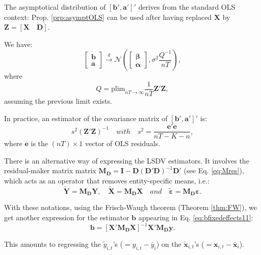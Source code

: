 \documentclass[
  12pt,
]{book}
\theoremstyle{definition}
\theoremstyle{definition}
\theoremstyle{definition}
\theoremstyle{definition}
\theoremstyle{remark}
\begin{document}
The asymptotical distribution of \([\mathbf{b}',\mathbf{a}']'\) derives from the standard OLS context: Prop. \ref{prp:asymptOLS} can be used after having replaced \(\mathbf{X}\) by \(\mathbf{Z}=[\mathbf{X} \quad \mathbf{D}]\).

We have:
\begin{equation}
\boxed{\left[
\begin{array}{c}
\mathbf{b}\\
\mathbf{a}
\end{array}
\right] \overset{d}{\rightarrow}
\mathcal{N}\left(
\left[
\begin{array}{c}
\boldsymbol\beta\\
\boldsymbol\alpha
\end{array}
\right],
\sigma^2 \frac{Q^{-1}}{nT}
\right),}
\end{equation}
where
\[
Q = \mbox{plim}_{nT \rightarrow \infty} \frac{1}{nT} \mathbf{Z}'\mathbf{Z},
\]
assuming the previous limit exists.

In practice, an estimator of the covariance matrix of \([\mathbf{b}',\mathbf{a}']'\) is:
\[
s^2 \left( \mathbf{Z}'\mathbf{Z}\right)^{-1} \quad with \quad s^2 = \frac{\mathbf{e}'\mathbf{e}}{nT - K - n},
\]
where \(\mathbf{e}\) is the \((nT) \times 1\) vector of OLS residuals.

There is an alternative way of expressing the LSDV estimators. It involves the residual-maker matrix matrix \(\mathbf{M_D}=\mathbf{I} - \mathbf{D}(\mathbf{D}'\mathbf{D})^{-1}\mathbf{D}'\) (see Eq. \eqref{eq:Mres}), which acts as an operator that removes entity-specific means, i.e.:
\[
\tilde{\mathbf{Y}} = \mathbf{M_D}\mathbf{Y}, \quad \tilde{\mathbf{X}} = \mathbf{M_D}\mathbf{X} \quad and \quad \tilde{\boldsymbol\varepsilon} = \mathbf{M_D}\boldsymbol\varepsilon.
\]

With these notations, using the Frisch-Waugh theorem (Theorem \ref{thm:FW}), we get another expression for the estimator \(\mathbf{b}\) appearing in Eq. \eqref{eq:bfixedeffects11}:
\begin{equation}
\boxed{\mathbf{b} = [\mathbf{X}'\mathbf{M_D}\mathbf{X}]^{-1}\mathbf{X}'\mathbf{M_D}\mathbf{y}.}\label{eq:bfixedeffects}
\end{equation}

This amounts to regressing the \(\tilde{y}_{i,t}\)'s (\(= y_{i,t} - \bar{y}_i\)) on the \(\tilde{\mathbf{x}}_{i,t}\)'s (\(=\mathbf{x}_{i,t} - \bar{\mathbf{x}}_i\)).
\end{document}
